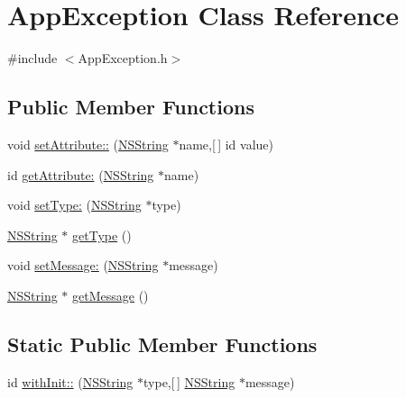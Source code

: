 \hypertarget{interface_app_exception}{
\section{\-App\-Exception \-Class \-Reference}
\label{interface_app_exception}
}


{\ttfamily \#include $<$\-App\-Exception.\-h$>$}

\subsection*{\-Public \-Member \-Functions}
\begin{DoxyCompactItemize}
\item 
void \hyperlink{interface_app_exception_a6e7580c5335641f718b9ec3630d1a4d5}{set\-Attribute\-::} (\hyperlink{class_n_s_string}{\-N\-S\-String} $\ast$name,\mbox{[}$\,$\mbox{]} id value)
\item 
id \hyperlink{interface_app_exception_acb38e60def6e93cd8e9171b4e82a7e72}{get\-Attribute\-:} (\hyperlink{class_n_s_string}{\-N\-S\-String} $\ast$name)
\item 
void \hyperlink{interface_app_exception_a1cea0f9a94f1eae48fc06a00433acaa7}{set\-Type\-:} (\hyperlink{class_n_s_string}{\-N\-S\-String} $\ast$type)
\item 
\hyperlink{class_n_s_string}{\-N\-S\-String} $\ast$ \hyperlink{interface_app_exception_ab93141af9f4d615c6a049bca822e3282}{get\-Type} ()
\item 
void \hyperlink{interface_app_exception_a50fc6238892c31620258a6ff03521ab2}{set\-Message\-:} (\hyperlink{class_n_s_string}{\-N\-S\-String} $\ast$message)
\item 
\hyperlink{class_n_s_string}{\-N\-S\-String} $\ast$ \hyperlink{interface_app_exception_acf803c19c970fc4c4654776c4a856f85}{get\-Message} ()
\end{DoxyCompactItemize}
\subsection*{\-Static \-Public \-Member \-Functions}
\begin{DoxyCompactItemize}
\item 
id \hyperlink{interface_app_exception_ad7ed8837d108097da57ee6d75b98fd22}{with\-Init\-::} (\hyperlink{class_n_s_string}{\-N\-S\-String} $\ast$type,\mbox{[}$\,$\mbox{]} \hyperlink{class_n_s_string}{\-N\-S\-String} $\ast$message)
\end{DoxyCompactItemize}


